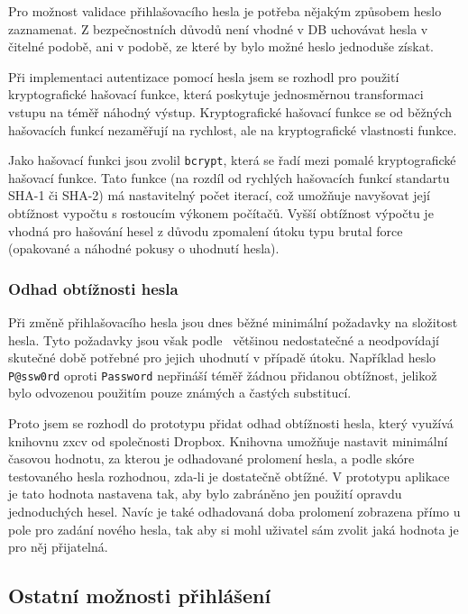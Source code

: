 Pro možnost validace přihlašovacího hesla je potřeba nějakým způsobem heslo zaznamenat.
Z bezpečnostních důvodů není vhodné v DB uchovávat hesla v čitelné podobě, ani v podobě, ze které by bylo možné heslo jednoduše získat.

Při implementaci autentizace pomocí hesla jsem se rozhodl pro použití kryptografické hašovací funkce, která poskytuje jednosměrnou transformaci vstupu na téměř náhodný výstup.
Kryptografické hašovací funkce se od běžných hašovacích funkcí nezaměřují na rychlost, ale na kryptografické vlastnosti funkce.

Jako hašovací funkci jsou zvolil \texttt{bcrypt}, která se řadí mezi pomalé kryptografické hašovací funkce.
Tato funkce (na rozdíl od rychlých hašovacích funkcí standartu SHA-1 či SHA-2) má nastavitelný počet iterací, což umožňuje navyšovat její obtížnost vypočtu s rostoucím výkonem počítačů.
Vyšší obtížnost výpočtu je vhodná pro hašování hesel z důvodu zpomalení útoku typu brutal force (opakované a náhodné pokusy o uhodnutí hesla).

\subsubsection{Odhad obtížnosti hesla}

Při změně přihlašovacího hesla jsou dnes běžné minimální požadavky na složitost hesla.
Tyto požadavky jsou však podle~\cite{dropbox:zxcv} většinou nedostatečné a neodpovídají skutečné době potřebné pro jejich uhodnutí v případě útoku.
Například heslo \texttt{P@ssw0rd} oproti \texttt{Password} nepřináší téměř žádnou přidanou obtížnost, jelikož bylo odvozenou použitím pouze známých a častých substitucí.

Proto jsem se rozhodl do prototypu přidat odhad obtížnosti hesla, který využívá knihovnu zxcv od společnosti Dropbox.
Knihovna umožňuje nastavit minimální časovou hodnotu, za kterou je odhadované prolomení hesla, a podle skóre testovaného hesla rozhodnou, zda-li je dostatečně obtížné.
V prototypu aplikace je tato hodnota nastavena tak, aby bylo zabráněno jen použití opravdu jednoduchých hesel.
Navíc je také odhadovaná doba prolomení zobrazena přímo u pole pro zadání nového hesla, tak aby si mohl uživatel sám zvolit jaká hodnota je pro něj přijatelná.

\subsection{Ostatní možnosti přihlášení}\label{subsec:ostatníMožnostiPřihlášení}

